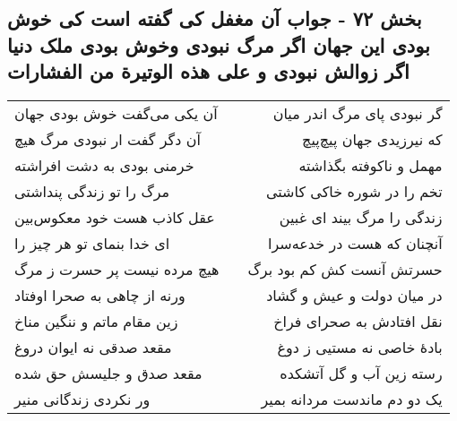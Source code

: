 \begin{center}
\section*{بخش ۷۲ - جواب آن مغفل کی گفته است کی خوش بودی این جهان اگر مرگ نبودی وخوش بودی ملک دنیا اگر زوالش نبودی و علی هذه  الوتیرة من الفشارات}
\label{sec:sh072}
\begin{longtable}{l p{0.5cm} r}
آن یکی می‌گفت خوش بودی جهان
&&
گر نبودی پای مرگ اندر میان
\\
آن دگر گفت ار نبودی مرگ هیچ
&&
که نیرزیدی جهان پیچ‌پیچ
\\
خرمنی بودی به دشت افراشته
&&
مهمل و ناکوفته بگذاشته
\\
مرگ را تو زندگی پنداشتی
&&
تخم را در شوره خاکی کاشتی
\\
عقل کاذب هست خود معکوس‌بین
&&
زندگی را مرگ بیند ای غبین
\\
ای خدا بنمای تو هر چیز را
&&
آنچنان که هست در خدعه‌سرا
\\
هیچ مرده نیست پر حسرت ز مرگ
&&
حسرتش آنست کش کم بود برگ
\\
ورنه از چاهی به صحرا اوفتاد
&&
در میان دولت و عیش و گشاد
\\
زین مقام ماتم و ننگین مناخ
&&
نقل افتادش به صحرای فراخ
\\
مقعد صدقی نه ایوان دروغ
&&
بادهٔ خاصی نه مستیی ز دوغ
\\
مقعد صدق و جلیسش حق شده
&&
رسته زین آب و گل آتشکده
\\
ور نکردی زندگانی منیر
&&
یک دو دم ماندست مردانه بمیر
\\
\end{longtable}
\end{center}
